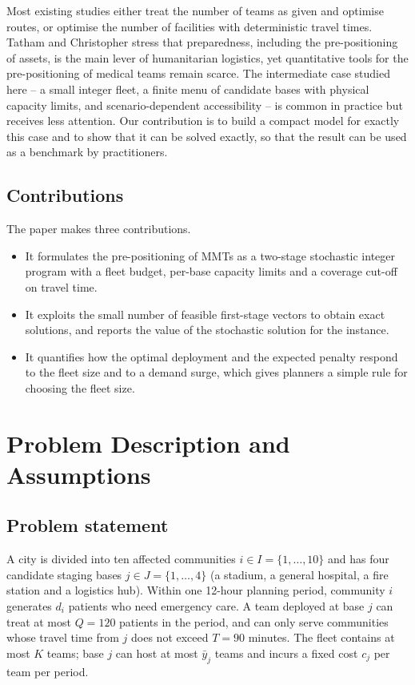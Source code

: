 \documentclass{apmcmthesis}
\begin{document}
Most existing studies either treat the number of teams as given and optimise routes, or optimise the number of facilities with deterministic travel times. Tatham and Christopher \cite{tatham2014} stress that preparedness, including the pre-positioning of assets, is the main lever of humanitarian logistics, yet quantitative tools for the pre-positioning of medical teams remain scarce. The intermediate case studied here -- a small integer fleet, a finite menu of candidate bases with physical capacity limits, and scenario-dependent accessibility -- is common in practice but receives less attention. Our contribution is to build a compact model for exactly this case and to show that it can be solved exactly, so that the result can be used as a benchmark by practitioners.

\subsection{Contributions}

The paper makes three contributions.
\begin{itemize}
\item It formulates the pre-positioning of MMTs as a two-stage stochastic integer program with a fleet budget, per-base capacity limits and a coverage cut-off on travel time.
\item It exploits the small number of feasible first-stage vectors to obtain exact solutions, and reports the value of the stochastic solution for the instance.
\item It quantifies how the optimal deployment and the expected penalty respond to the fleet size and to a demand surge, which gives planners a simple rule for choosing the fleet size.
\end{itemize}

\section{Problem Description and Assumptions}

\subsection{Problem statement}

A city is divided into ten affected communities $i\in I=\{1,\dots,10\}$ and has four candidate staging bases $j\in J=\{1,\dots,4\}$ (a stadium, a general hospital, a fire station and a logistics hub). Within one 12-hour planning period, community $i$ generates $d_i$ patients who need emergency care. A team deployed at base $j$ can treat at most $Q=120$ patients in the period, and can only serve communities whose travel time from $j$ does not exceed $T=90$ minutes. The fleet contains at most $K$ teams; base $j$ can host at most $\bar y_j$ teams and incurs a fixed cost $c_j$ per team per period.
\end{document}
